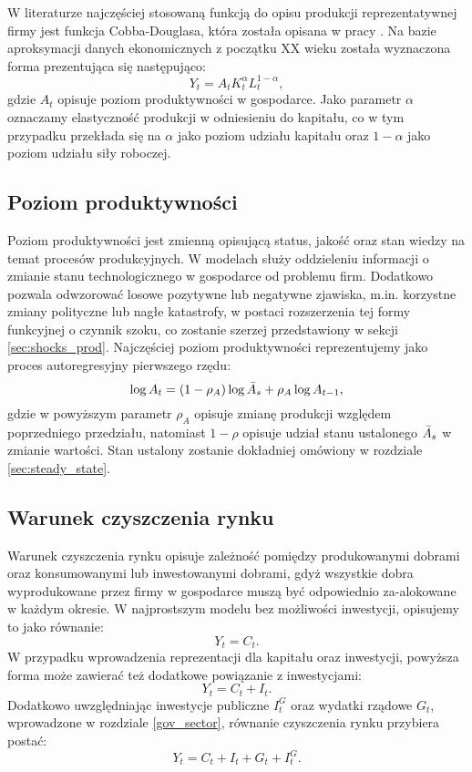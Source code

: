 W literaturze najczęściej stosowaną funkcją do opisu produkcji reprezentatywnej firmy jest funkcja Cobba-Douglasa, która została opisana w pracy \cite{10.2307/1811556}. Na bazie aproksymacji danych ekonomicznych z początku XX wieku została wyznaczona forma prezentująca się następująco:
\begin{equation}
    \label{eqn:production_firm_base}
    Y_{t} = A_t K_{t}^\alpha L^{1-\alpha}_{t},
\end{equation}
gdzie $A_t$ opisuje poziom produktywności w gospodarce. Jako parametr $\alpha$ oznaczamy elastyczność produkcji w odniesieniu do kapitału, co w tym przypadku przekłada się na $\alpha$ jako poziom udziału kapitału oraz $1-\alpha$ jako poziom udziału siły roboczej.

\subsection{Poziom produktywności}

Poziom produktywności jest zmienną opisującą status, jakość oraz stan wiedzy na temat procesów produkcyjnych. W modelach służy oddzieleniu informacji o zmianie stanu technologicznego w gospodarce od problemu firm. Dodatkowo pozwala odwzorować losowe pozytywne lub negatywne zjawiska, m.in. korzystne zmiany polityczne lub nagłe katastrofy, w postaci rozszerzenia tej formy funkcyjnej o czynnik szoku, co zostanie szerzej przedstawiony w sekcji \ref{sec:shocks_prod}. Najczęściej poziom produktywności reprezentujemy jako proces autoregresyjny pierwszego rzędu:
\begin{equation*}
    \log{A_t} = (1-\rho_A)\log{\bar{A}_s} + \rho_A \log{A_{t-1}},
\end{equation*}
gdzie w powyższym parametr $\rho_A$ opisuje zmianę produkcji względem poprzedniego przedziału, natomiast $1-\rho$ opisuje udział stanu ustalonego $\bar{A}_s$ w zmianie wartości. Stan ustalony zostanie dokładniej omówiony w rozdziale \ref{sec:steady_state}.

\subsection{Warunek czyszczenia rynku}

Warunek czyszczenia rynku opisuje zależność pomiędzy produkowanymi dobrami oraz konsumowanymi lub inwestowanymi dobrami, gdyż wszystkie dobra wyprodukowane przez firmy w gospodarce muszą być odpowiednio za-alokowane w każdym okresie. W najprostszym modelu bez możliwości inwestycji, opisujemy to jako równanie:
\begin{equation}
    Y_t = C_t.
\end{equation}
W przypadku wprowadzenia reprezentacji dla kapitału oraz inwestycji, powyższa forma może zawierać też dodatkowe powiązanie z inwestycjami:
\begin{equation}
    Y_t = C_t + I_t.
\end{equation}
Dodatkowo uwzględniając inwestycje publiczne $I^G_t$ oraz wydatki rządowe $G_t$, wprowadzone w rozdziale \ref{gov_sector}, równanie czyszczenia rynku przybiera postać:
\begin{equation}
    Y_t = C_t + I_t + G_t + I^G_t.
\end{equation}

